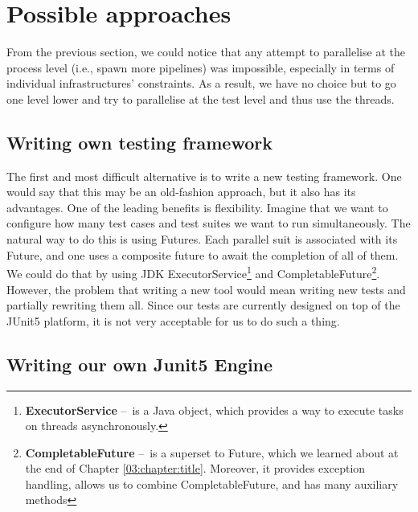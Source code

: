 \section{Possible approaches}
\label{05:possibleapproaches}

From the previous section, we could notice that any attempt to parallelise at the process level (i.e., spawn more pipelines) was impossible, especially in terms of individual infrastructures' constraints.
As a result, we have no choice but to go one level lower and try to parallelise at the test level and thus use the threads.

\subsection{Writing own testing framework}

The first and most difficult alternative is to write a new testing framework.
One would say that this may be an old-fashion approach, but it also has its advantages.
One of the leading benefits is flexibility.
Imagine that we want to configure how many test cases and test suites we want to run simultaneously.
The natural way to do this is using Futures.
Each parallel suit is associated with its Future, and one uses a composite future to await the completion of all of them.
We could do that by using JDK ExecutorService\footnote{\textbf{ExecutorService} \---\ is a Java object, which provides a way to execute tasks on threads asynchronously.} and CompletableFuture\footnote{\textbf{CompletableFuture} \---\ is a superset to Future, which we learned about at the end of Chapter \ref{03:chapter:title}. Moreover, it provides exception handling, allows us to combine CompletableFuture, and has many auxiliary methods}.
However, the problem that writing a new tool would mean writing new tests and partially rewriting them all.
Since our tests are currently designed on top of the JUnit5 platform, it is not very acceptable for us to do such a thing.

\subsection{Writing our own Junit5 Engine}

